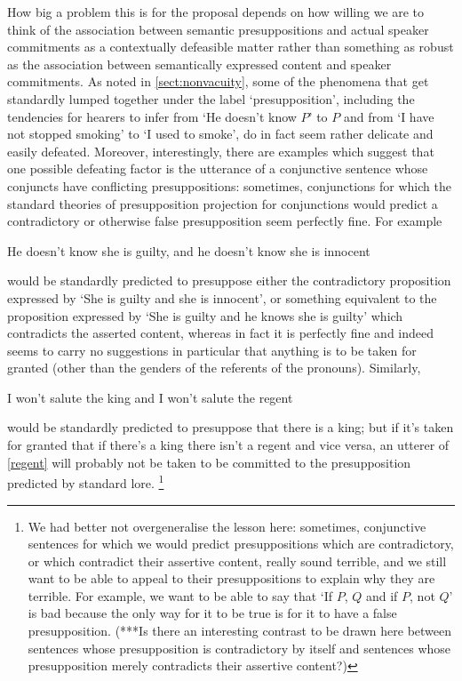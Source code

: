 \documentclass[If.tex]{subfiles}
\begin{document}
How big a problem this is for the proposal depends on how willing we are to think of the association between semantic presuppositions and actual speaker commitments as a contextually defeasible matter rather than something as robust as the association between semantically expressed content and speaker commitments.  As noted in \ref{sect:nonvacuity}, some of the phenomena that get standardly lumped together under the label ‘presupposition’, including the tendencies for hearers to infer from ‘He doesn't know $P$’ to $P$ and from ‘I have not stopped smoking’ to ‘I used to smoke’, do in fact seem rather delicate and easily defeated.  Moreover, interestingly, there are examples which suggest that one possible defeating factor is the utterance of a conjunctive sentence whose conjuncts have conflicting presuppositions: sometimes, conjunctions for which the standard theories of presupposition projection for conjunctions would predict a contradictory or otherwise false presupposition seem perfectly fine.  For example
\begin{prop}
	\nitem \label{innocent}
	He doesn't know she is guilty, and he doesn't know she is innocent
\end{prop}
would be standardly predicted to presuppose either the contradictory proposition expressed by ‘She is guilty and she is innocent’, or something equivalent to the proposition expressed by ‘She is guilty and he knows she is guilty’ which contradicts the asserted content, whereas in fact it is perfectly fine and indeed seems to carry no suggestions in particular that anything is to be taken for granted (other than the genders of the referents of the pronouns). Similarly,
\begin{prop}
	\nitem \label{regent}
	I won't salute the king and I won't salute the regent
\end{prop}
would be standardly predicted to presuppose that there is a king; but if it's taken for granted that if there's a king there isn't a regent and vice versa, an utterer of \ref{regent} will probably not be taken to be committed to the presupposition predicted by standard lore.%
\footnote{We had better not overgeneralise the lesson here: sometimes, conjunctive sentences for which we would predict presuppositions which are contradictory, or which contradict their assertive content, really sound terrible, and we still want to be able to appeal to their presuppositions to explain why they are terrible.  For example, we want to be able to say that ‘If $P$, $Q$ and if $P$, not $Q$’ is bad because the only way for it to be true is for it to have a false presupposition.  (***Is there an interesting contrast to be drawn here between sentences whose presupposition is contradictory by itself and sentences whose presupposition merely contradicts their assertive content?) }  
\end{document}
